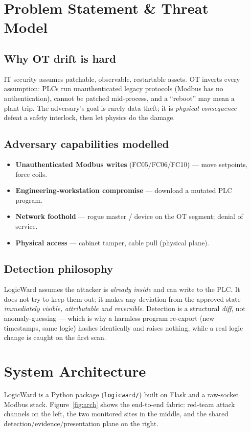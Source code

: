 \documentclass[11pt,a4paper]{article}
\newcommand{\code}[1]{\texttt{\small #1}}
\begin{document}
\section{Problem Statement \& Threat Model}
\subsection{Why OT drift is hard}
IT security assumes patchable, observable, restartable assets. OT inverts every assumption:
PLCs run unauthenticated legacy protocols (Modbus has no authentication), cannot be patched
mid-process, and a ``reboot'' may mean a plant trip. The adversary's goal is rarely data theft;
it is \emph{physical consequence} --- defeat a safety interlock, then let physics do the damage.

\subsection{Adversary capabilities modelled}
\begin{itemize}[leftmargin=1.3em,itemsep=2pt]
  \item \textbf{Unauthenticated Modbus writes} (FC05/FC06/FC10) --- move setpoints, force coils.
  \item \textbf{Engineering-workstation compromise} --- download a mutated PLC program.
  \item \textbf{Network foothold} --- rogue master / device on the OT segment; denial of service.
  \item \textbf{Physical access} --- cabinet tamper, cable pull (physical plane).
\end{itemize}

\subsection{Detection philosophy}
LogicWard assumes the attacker is \emph{already inside} and can write to the PLC. It does not
try to keep them out; it makes any deviation from the approved state \emph{immediately visible,
attributable and reversible}. Detection is a structural \emph{diff}, not anomaly-guessing ---
which is why a harmless program re-export (new timestamps, same logic) hashes identically and
raises nothing, while a real logic change is caught on the first scan.

\section{System Architecture}
LogicWard is a Python package (\code{logicward/}) built on Flask and a raw-socket Modbus stack.
Figure~\ref{fig:arch} shows the end-to-end fabric: red-team attack channels on the left, the two
monitored sites in the middle, and the shared detection/evidence/presentation plane on the right.
\end{document}

